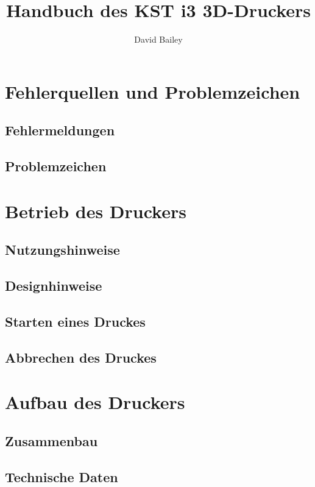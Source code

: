 \documentclass[11pt,a4paper]{article}
\title{Handbuch des KST i3 3D-Druckers}
\author{David Bailey}
\begin{document}
\maketitle
\newpage

\tableofcontents
\newpage

\section{Fehlerquellen und Problemzeichen}
\subsection{Fehlermeldungen}

\subsection{Problemzeichen}


\newpage
\section{Betrieb des Druckers}
\subsection{Nutzungshinweise}

\subsection{Designhinweise}

\subsection{Starten eines Druckes}
\subsection{Abbrechen des Druckes}

\section{Aufbau des Druckers}
\subsection{Zusammenbau}

\subsection{Technische Daten}

\end{document}
